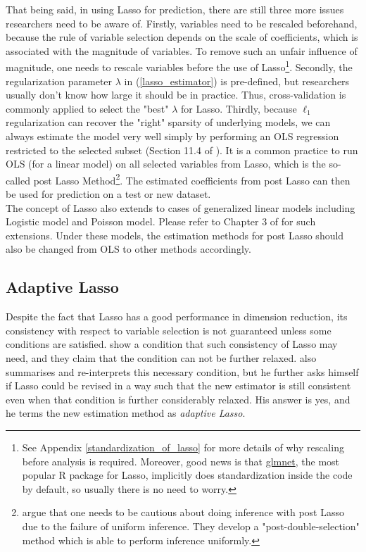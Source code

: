 \documentclass[12pt, a4paper]{article}
\theoremstyle{MAstyle} \newtheorem{assumption}{Assumption}[section]
\theoremstyle{MAstyle} \newtheorem{definition}{Definition}[section]
\theoremstyle{MAstyle} \newtheorem{theorem}{Theorem}[section]
\theoremstyle{MAstyle} \newtheorem{corollary}{Corollary}[section]
\begin{document}
        That being said, in using Lasso for prediction, there are still three more issues researchers need to be aware of. Firstly, variables need to be rescaled beforehand, because the rule of variable selection depends on the scale of coefficients, which is associated with the magnitude of variables. To remove such an unfair influence of magnitude, one needs to rescale variables before the use of Lasso\footnote{See Appendix \ref{standardization_of_lasso} for more details of why rescaling before analysis is required. Moreover, good news is that \href{https://glmnet.stanford.edu/}{glmnet}, the most popular R package for Lasso, implicitly does standardization inside the code by default, so usually there is no need to worry.}. Secondly, the regularization parameter $\lambda$ in (\ref{lasso_estimator}) is pre-defined, but researchers usually don't know how large it should be in practice. Thus, cross-validation is commonly applied to select the "best" $\lambda$ for Lasso. Thirdly, because $\ell_1$ regularization can recover the "right" sparsity of underlying models, we can always estimate the model very well simply by performing an OLS regression restricted to the selected subset (Section 11.4 of \cite{Hastie_Tibshirani_Wainwright_2015}). It is a common practice to run OLS (for a linear model) on all selected variables from Lasso, which is the so-called post Lasso Method\footnote{\cite{Belloni_Chernozhukov_Hansen_2013} argue that one needs to be cautious about doing inference with post Lasso due to the failure of uniform inference. They develop a "post-double-selection" method which is able to perform inference uniformly.}. The estimated coefficients from post Lasso can then be used for prediction on a test or new dataset.\\

        The concept of Lasso also extends to cases of generalized linear models including Logistic model and Poisson model. Please refer to Chapter 3 of \cite{Bühlmann_van_de_Geer_2011} for such extensions. Under these models, the estimation methods for post Lasso should also be changed from OLS to other methods accordingly. 

        \subsection{Adaptive Lasso}

        Despite the fact that Lasso has a good performance in dimension reduction, its consistency with respect to variable selection is not guaranteed unless some conditions are satisfied. \cite{Meinshausen_Bühlmann_2006} show a condition that such consistency of Lasso may need, and they claim that the condition can not be further relaxed. \cite{Zou_2006} also summarises and re-interprets this necessary condition, but he further asks himself if Lasso could be revised in a way such that the new estimator is still consistent even when that condition is further considerably relaxed. His answer is yes, and he terms the new estimation method as \textit{adaptive Lasso}.\\
\end{document}
